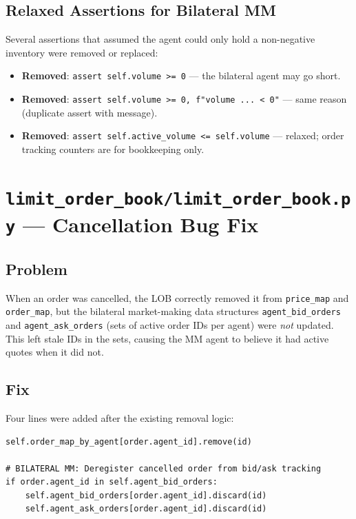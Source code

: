 \documentclass[11pt,a4paper]{article}
\begin{document}
\subsection{Relaxed Assertions for Bilateral MM}

Several assertions that assumed the agent could only hold a non-negative
inventory were removed or replaced:

\begin{itemize}[leftmargin=*]
    \item \textbf{Removed}: \lstinline{assert self.volume >= 0}
          — the bilateral agent may go short.
    \item \textbf{Removed}: \lstinline{assert self.volume >= 0, f"volume ... < 0"}
          — same reason (duplicate assert with message).
    \item \textbf{Removed}: \lstinline{assert self.active_volume <= self.volume}
          — relaxed; order tracking counters are for bookkeeping only.
\end{itemize}

\section{\texttt{limit\_order\_book/limit\_order\_book.py} — Cancellation Bug Fix}

\subsection{Problem}

When an order was cancelled, the LOB correctly removed it from
\texttt{price\_map} and \texttt{order\_map}, but the bilateral
market-making data structures \texttt{agent\_bid\_orders} and
\texttt{agent\_ask\_orders} (sets of active order IDs per agent) were
\emph{not} updated.  This left stale IDs in the sets, causing the MM
agent to believe it had active quotes when it did not.

\subsection{Fix}

Four lines were added after the existing removal logic:

\begin{lstlisting}
self.order_map_by_agent[order.agent_id].remove(id)

# BILATERAL MM: Deregister cancelled order from bid/ask tracking
if order.agent_id in self.agent_bid_orders:
    self.agent_bid_orders[order.agent_id].discard(id)
    self.agent_ask_orders[order.agent_id].discard(id)
\end{lstlisting}
\end{document}
